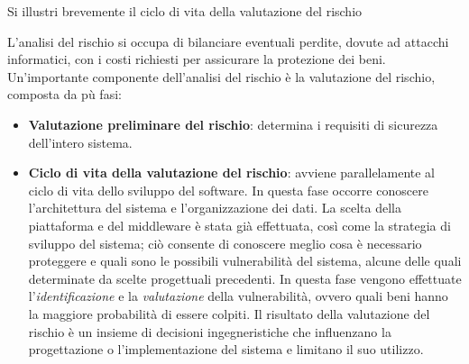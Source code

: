 \begin{problem}{2.5}
Si illustri brevemente il ciclo di vita della valutazione del rischio
\end{problem}
\begin{solution}
L'analisi del rischio si occupa di bilanciare eventuali perdite, dovute ad attacchi informatici, con i costi richiesti per assicurare la protezione dei beni.
\newline
Un'importante componente dell'analisi del rischio è la valutazione del rischio, composta da pù fasi:
\begin{itemize}
	\item \textbf{Valutazione preliminare del rischio}: determina i requisiti di sicurezza dell'intero sistema.
	\item \textbf{Ciclo di vita della valutazione del rischio}: avviene parallelamente al ciclo di vita dello sviluppo del software.
	\newline
	In questa fase occorre conoscere l'architettura del sistema e l'organizzazione dei dati.
	\newline
	La scelta della piattaforma e del middleware è stata già effettuata, così come la strategia di sviluppo del sistema; ciò consente di conoscere meglio cosa è necessario proteggere e quali sono le possibili vulnerabilità del sistema, alcune delle quali determinate da scelte progettuali precedenti.
	\newline
	In questa fase vengono effettuate l'\textit{identificazione} e la \textit{valutazione} della vulnerabilità, ovvero quali beni hanno la maggiore probabilità di essere colpiti.
	\newline
	Il risultato della valutazione del rischio è un insieme di decisioni ingegneristiche che influenzano la progettazione o l'implementazione del sistema e limitano il suo utilizzo.
\end{itemize}
\end{solution}

